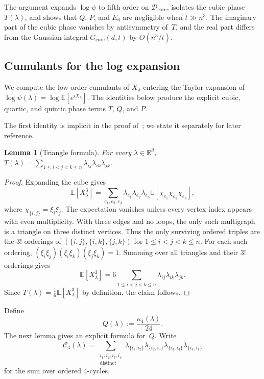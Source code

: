 \documentclass[11pt]{article}
\newtheorem{lemma}[theorem]{Lemma}
\theoremstyle{definition}
\newcommand{\R}{\mathbb{R}}
\newcommand{\E}{\mathbb{E}}
\newcommand{\corereg}{\mathcal{D}_\mathrm{core}}
\newcommand{\core}{G_{\mathrm{core}}}
\begin{document}
The argument expands \(\log\psi\) to fifth order on \(\corereg\), isolates the cubic phase \(T(\lambda)\), and shows that \(Q\), \(P\), and \(E_6\) are negligible when \(t\gg n^3\). The imaginary part of the cubic phase vanishes by antisymmetry of~\(T\), and the real part differs from the Gaussian integral \(\core(d,t)\) by \(O(n^3/t)\).

\subsection{Cumulants for the log expansion}

We compute the low-order cumulants of \(X_\lambda\) entering the Taylor expansion of \(\log\psi(\lambda)=\log \E[e^{iX_\lambda}]\). The identities below produce the explicit cubic, quartic, and quintic phase terms \(T\), \(Q\), and \(P\).

The first identity is implicit in the proof of~\cite[Lemma~3.1]{DL10}; we state it separately for later reference.

\begin{lemma}[Triangle formula]\label{lem:triangle}
For every \(\lambda\in\R^d\),
\(T(\lambda)=\sum_{1\le i<j<k\le n}\lambda_{ij}\lambda_{ik}\lambda_{jk}\).
\end{lemma}

\begin{proof}
Expanding the cube gives
\[
  \E[X_\lambda^3]
  =\sum_{e_1,e_2,e_3}\lambda_{e_1}\lambda_{e_2}\lambda_{e_3}
    \E[\chi_{e_1}\chi_{e_2}\chi_{e_3}],
\]
where \(\chi_{\{i,j\}}=\xi_i\xi_j\). The expectation vanishes unless every vertex index appears with even multiplicity. With three edges and no loops, the only such multigraph is a triangle on three distinct vertices. Thus the only surviving ordered triples are the \(3!\) orderings of $(\{i,j\},\{i,k\},\{j,k\})$ for $1\le i<j<k\le n.$
For each such ordering, $(\xi_i\xi_j)(\xi_i\xi_k)(\xi_j\xi_k)=1.$ 
Summing over all triangles and their \(3!\) orderings gives
\[
  \E[X_\lambda^3]
  =6\sum_{1\le i<j<k\le n}\lambda_{ij}\lambda_{ik}\lambda_{jk}.
\]
Since \(T(\lambda)=\frac16\E[X_\lambda^3]\) by definition, the claim follows.
\end{proof}

Define
\[
  Q(\lambda):=\frac{\kappa_4(\lambda)}{24}.
\]
The next lemma gives an explicit formula for~\(Q\). Write
\begin{equation}\label{eq:C4}
  \mathcal{C}_4(\lambda)
  =
    \sum_{\substack{i_1,i_2,i_3,i_4\\ \text{distinct}}}
      \lambda_{\{i_1,i_2\}}
      \lambda_{\{i_2,i_3\}}
      \lambda_{\{i_3,i_4\}}
    \lambda_{\{i_4,i_1\}}
\end{equation}
for the sum over ordered \(4\)-cycles.
\end{document}
